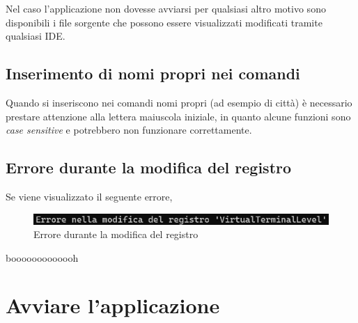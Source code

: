 \documentclass[12pt]{scrreprt}
\begin{document}
		Nel caso l'applicazione non dovesse avviarsi per qualsiasi altro motivo sono disponibili i file sorgente che possono essere visualizzati modificati tramite qualsiasi IDE.
		
		\subsection{Inserimento di nomi propri nei comandi}
		Quando si inseriscono nei comandi nomi propri (ad esempio di citt\`a) \`e necessario prestare attenzione alla lettera maiuscola iniziale, in quanto alcune funzioni sono \textsl{case sensitive} e potrebbero non funzionare correttamente.
		
		\subsection{Errore durante la modifica del registro}
		Se viene visualizzato il seguente errore,
		\begin{figure}[H]
			\centering
			\includegraphics[width=0.8\linewidth]{Screen/erroremodificaregistro}
			\caption{Errore durante la modifica del registro}
			\label{fig:erroremodififcaregistro}
		\end{figure}
		
	booooooooooooh	
	
	\section{Avviare l'applicazione}
	
\end{document}
